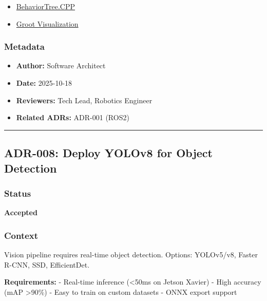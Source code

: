 \documentclass[
]{article}
\providecommand{\tightlist}{%
  \setlength{\itemsep}{0pt}\setlength{\parskip}{0pt}}
\begin{document}
\begin{itemize}
\tightlist
\item
  \href{https://www.behaviortree.dev/}{BehaviorTree.CPP}
\item
  \href{https://github.com/BehaviorTree/Groot}{Groot Visualization}
\end{itemize}

\hypertarget{metadata-6}{%
\subsubsection{Metadata}\label{metadata-6}}

\begin{itemize}
\tightlist
\item
  \textbf{Author:} Software Architect
\item
  \textbf{Date:} 2025-10-18
\item
  \textbf{Reviewers:} Tech Lead, Robotics Engineer
\item
  \textbf{Related ADRs:} ADR-001 (ROS2)
\end{itemize}

\begin{center}\rule{0.5\linewidth}{0.5pt}\end{center}

\hypertarget{adr-008-deploy-yolov8-for-object-detection}{%
\subsection{ADR-008: Deploy YOLOv8 for Object
Detection}\label{adr-008-deploy-yolov8-for-object-detection}}

\hypertarget{status-7}{%
\subsubsection{Status}\label{status-7}}

\textbf{Accepted}

\hypertarget{context-7}{%
\subsubsection{Context}\label{context-7}}

Vision pipeline requires real-time object detection. Options: YOLOv5/v8,
Faster R-CNN, SSD, EfficientDet.

\textbf{Requirements:} - Real-time inference (\textless50ms on Jetson
Xavier) - High accuracy (mAP \textgreater90\%) - Easy to train on custom
datasets - ONNX export support
\end{document}
